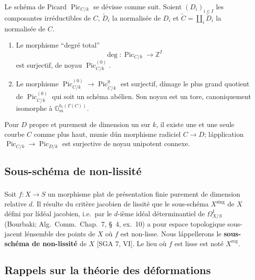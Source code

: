 \documentclass{amsart}
\theoremstyle{plain}
\theoremstyle{remark}
\DeclareMathOperator{\Pic}{Pic}
\newcommand{\bbG}{\mathbb{G}}
\newcommand{\bbZ}{\mathbb{Z}}
\begin{document}
Le sch\'ema de Picard $\Pic_{C/k}$ se d\'evisse comme suit. Soient $(D_i)_{i \in I}$ les
composantes irr\'eductibles de $C$, $\widetilde{D}_i$ la normalis\'ee de $D_i$ et
$\widetilde{C} = \coprod_i \widetilde{D}_i$ la normalis\'ee de $C$.

\begin{enumerate}
\item[(a)] Le morphisme ``degr\'e total''
\[
\deg: \Pic_{C/k} \to \bbZ^I
\]
est surjectif, de noyau $\Pic^{(0)}_{C/k}$.
\item[(b)] Le morphisme $\Pic^{(0)}_{C/k} \to \Pic^0_{\widetilde{C}/k}$ est surjectif, d\'image
le plus grand quotient de $\Pic^{(0)}_{C/k}$ qui soit un sch\'ema ab\'elien. Son noyau est un
tore, canoniquement isomorphe \`a $\bbG_m^{b_1(\Gamma(C))}$.
\end{enumerate}

Pour $D$ propre et purement de dimension un sur $k$, il existe une et une seule courbe
$C$ comme plus haut, munie d\'un morphisme radiciel $C \to D$; l\'application
$\Pic_{C/k} \to \Pic_{D/k}$ est surjective de noyau unipotent connexe.

\subsection{Sous-sch\'ema de non-lissit\'e}

\subsubsection{}
Soit $f: X \to S$ un morphisme plat de pr\'esentation finie purement de dimension
relative $d$. Il r\'esulte du crit\`ere jacobien de lissit\'e que le sous-sch\'ema $X^{\mathrm{sing}}$
de $X$ d\'efini par l\'id\'eal jacobien, i.e.~par le $d$-i\`eme id\'eal d\'eterminantiel de
$\Omega^1_{X/S}$ (Bourbaki; Alg.~Comm.~Chap.~7, \S~4, ex.~10) a pour espace topologique
sous-jacent l\'ensemble des points de $X$ o\`u $f$ est non-lisse. Nous l\'appellerons le
\textbf{sous-sch\'ema de non-lissit\'e} de $X$ [SGA 7, VI]. Le lieu o\`u $f$ est lisse est
not\'e $X^{\mathrm{reg}}$.

\subsection{Rappels sur la th\'eorie des d\'eformations}
\end{document}
